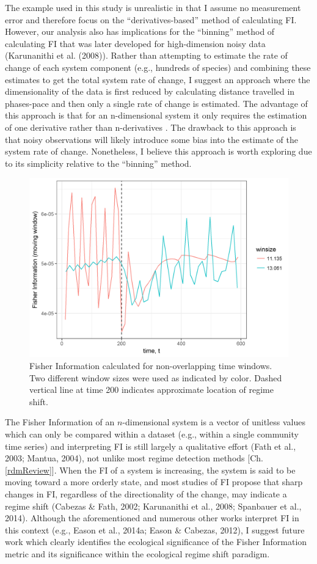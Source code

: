 \documentclass[12pt,twoside,openany]{reedthesis}
\begin{document}
The example used in this study is unrealistic in that I assume no measurement error and therefore focus on the ``derivatives-based'' method of calculating FI. However, our analysis also has implications for the ``binning'' method of calculating FI that was later developed for high-dimension noisy data (Karunanithi et al. (2008)). Rather than attempting to estimate the rate of change of each system component (e.g., hundreds of species) and combining these estimates to get the total system rate of change, I suggest an approach where the dimensionality of the data is first reduced by calculating distance travelled in phases-pace and then only a single rate of change is estimated. The advantage of this approach is that for an n-dimensional system it only requires the estimation of one derivative rather than n-derivatives . The drawback to this approach is that noisy observations will likely introduce some bias into the estimate of the system rate of change. Nonetheless, I believe this approach is worth exploring due to its simplicity relative to the ``binning'' method.
\begin{figure}
\includegraphics[width=0.95\linewidth]{./chapterFiles/fiGuide/figures/fiOverTime} \caption{Fisher Information calculated for non-overlapping time windows. Two different window sizes were used as indicated by color. Dashed vertical line at time 200 indicates approximate location of regime shift.}\label{fig:fiOverTime}
\end{figure}
The Fisher Information of an \(n\)-dimensional system is a vector of unitless values which can only be compared within a dataset (e.g., within a single community time series) and interpreting FI is still largely a qualitative effort (Fath et al., 2003; Mantua, 2004), not unlike most regime detection methods {[}Ch. \ref{rdmReview}{]}. When the FI of a system is increasing, the system is said to be moving toward a more orderly state, and most studies of FI propose that sharp changes in FI, regardless of the directionality of the change, may indicate a regime shift (Cabezas \& Fath, 2002; Karunanithi et al., 2008; Spanbauer et al., 2014). Although the aforementioned and numerous other works interpret FI in this context (e.g., Eason et al., 2014a; Eason \& Cabezas, 2012), I suggest future work which clearly identifies the ecological significance of the Fisher Information metric and its significance within the ecological regime shift paradigm.
\end{document}
